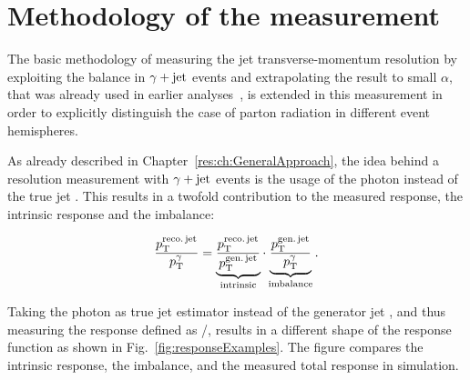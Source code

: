 \FloatBarrier
\chapter{Methodology of the measurement}
\label{res:ch:methodology}

The basic methodology of measuring the jet transverse-momentum resolution by exploiting the \pt balance in $\gamma + \text{jet}$ events and extrapolating the result to small $\alpha$, that was already used in earlier analyses~\cite{bib:CMS:JERCPaper_2011,CMS:PAS:JETResolution_7TeV}, 
is extended in this measurement in order to explicitly distinguish the case of parton radiation in different event hemispheres.

As already described in Chapter~\ref{res:ch:GeneralApproach}, the idea behind a resolution measurement with $\gamma + \text{jet}$ events is the usage of the photon \pt instead of the true jet \pt.
This results in a twofold contribution to the measured response, the intrinsic response and the imbalance:

\begin{equation}\label{eq:splittedResolution}
\frac{{p}_\mathrm{T}^{\text{reco.\,jet}}}{{p}_\mathrm{T}^{\gamma}} = \underbrace{\frac{{p}_\mathrm{T}^{\text{reco.\,jet}}}{{p}_\mathrm{T}^{\text{gen.\,jet}}}}_{\text{intrinsic}} \cdot \underbrace{\frac{{p}_\mathrm{T}^{\text{gen.\,jet}}}{{p}_\mathrm{T}^{\gamma}}}_{\text{imbalance}}.
\end{equation}

Taking the photon \pt as true jet \pt estimator instead of the generator jet \pt, and thus measuring the response defined as \ptrecojet/\ptgamma, results in a different shape of the response function as shown in Fig.~\ref{fig:responseExamples}. 
The figure compares the intrinsic response, the imbalance, and the measured total response in simulation. 

